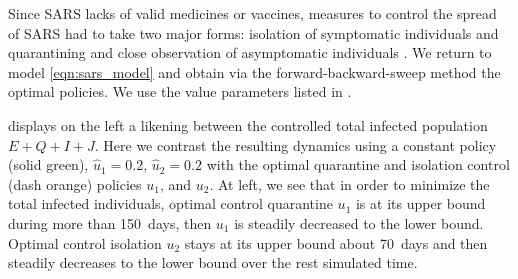   Since SARS lacks of valid medicines or vaccines, measures to control the 
spread of SARS had to take two major forms: isolation of symptomatic 
individuals and quarantining and close observation of asymptomatic 
individuals \cite{who_sars}. We return to model \eqref{eqn:sars_model} and 
obtain via the forward-backward-sweep method the optimal policies. We use the 
value parameters listed in .

   displays on the left a likening between the 
controlled total infected population $E + Q + I + J$. Here we contrast the 
resulting dynamics using a constant policy (solid green), 
$\widehat{u}_1 =\num{0.2}$, $\widehat{u}_2 = \num{0.2}$ with the optimal 
quarantine and isolation control (dash orange) policies $u_1$, and $u_2$. At 
left, we see that in order to minimize the total infected individuals, optimal 
control quarantine $u_1$ is at its upper bound during more than \SI{150}{days}, 
then $u_1$ is steadily decreased to the lower bound. Optimal control isolation 
$u_2$ stays at its  upper bound about \SI{70}{days} and then steadily decreases 
to the lower bound over the rest simulated time.


